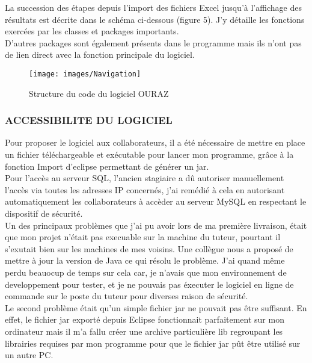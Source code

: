 La succession des étapes depuis l’import des fichiers Excel jusqu’à l’affichage des résultats est décrite dans le schéma ci-dessous (figure 5). J’y détaille les fonctions exercées par les classes et packages importants.\\

D’autres packages sont également présents dans le programme mais ils n’ont pas de lien direct avec la fonction principale du logiciel.


\begin{figure}[!h]
\begin{center}
\texttt{[image: images/Navigation]}
\end{center}
\caption{Structure du code du logiciel OURAZ}
\end{figure}
\subsubsection{	ACCESSIBILITE DU LOGICIEL }

Pour proposer le logiciel aux collaborateurs, il a été nécessaire de mettre en place un fichier téléchargeable et exécutable pour lancer mon programme, grâce à la fonction Import d’eclipse permettant de générer un jar.\\

Pour l’accès au serveur SQL, l’ancien stagiaire a dû autoriser manuellement l’accès via toutes les adresses IP concernés, j’ai remédié à cela en autorisant automatiquement les collaborateurs à accèder au serveur MySQL en respectant le dispositif de sécurité. \\

Un des principaux problèmes que j’ai pu avoir lors de ma première livraison, était que mon projet n’était pas execuable sur la machine du tuteur, pourtant il s’exutait bien sur les machines de mes voisins. Une collègue nous a proposé de mettre à jour la version de Java ce qui résolu le problème. J’ai quand même perdu beauocup de temps sur cela car, je n’avais que mon environnement de developpement pour tester, et je ne pouvais pas éxecuter le logiciel en ligne de commande sur le poste du tuteur pour diverses raison de sécurité.\\

Le second problème était qu’un simple fichier jar ne pouvait pas être suffisant. En effet, le fichier jar exporté depuis Eclipse fonctionnait parfaitement sur mon ordinateur mais il m’a fallu créer une archive particulière lib regroupant les librairies requises par mon programme pour que le fichier jar pût être utilisé sur un autre PC.\\ 

